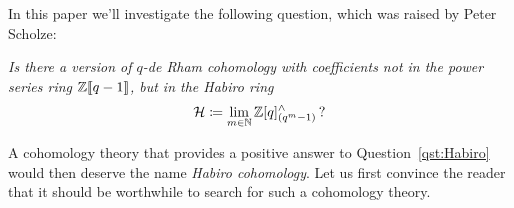 \documentclass[DIV=12,numbers=enddot,leqno,bibliography=totoc]{scrartcl}
\begin{document}
	In this paper we'll investigate the following question, which was raised by Peter Scholze:
	
	\begin{numpar}[Question.]\label{qst:Habiro}\itshape
		Is there a version of $q$-de Rham cohomology with coefficients not in the power series ring $\mathbb{Z}\llbracket q-1\rrbracket$, but in the Habiro ring
		\begin{equation*}
			\Hh\coloneqq \limit_{m\in\IN}\IZ[q]_{(q^m-1)}^\complete\,?
		\end{equation*}
	\end{numpar}
	A cohomology theory that provides a positive answer to Question~\cref{qst:Habiro} would then deserve the name \emph{Habiro cohomology}. Let us first convince the reader that it should be worthwhile to search for such a cohomology theory.
	
\end{document}
